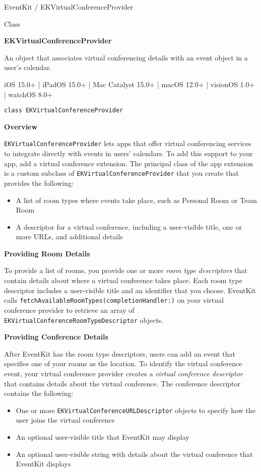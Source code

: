 \documentclass{article}
\title{}
\author{}
\date{}
\begin{document}
EventKit / EKVirtualConferenceProvider

Class

\textbf{EKVirtualConferenceProvider}

An object that associates virtual conferencing details with an event object in a user's calendar.

iOS 15.0+ | iPadOS 15.0+ | Mac Catalyst 15.0+ | macOS 12.0+ | visionOS 1.0+ | watchOS 8.0+

\texttt{class EKVirtualConferenceProvider}

\textbf{Overview}

\texttt{EKVirtualConferenceProvider} lets apps that offer virtual conferencing services to integrate directly with events in users' calendars. To add this support to your app, add a virtual conference extension. The principal class of the app extension is a custom subclass of \texttt{EKVirtualConferenceProvider} that you create that provides the following:

\begin{itemize}
\item A list of room types where events take place, such as Personal Room or Team Room
\item A descriptor for a virtual conference, including a user-visible title, one or more URLs, and additional details
\end{itemize}

\textbf{Providing Room Details}

To provide a list of rooms, you provide one or more \textit{room type descriptors} that contain details about where a virtual conference takes place. Each room type descriptor includes a user-visible title and an identifier that you choose. EventKit calls \texttt{fetchAvailableRoomTypes(completionHandler:)} on your virtual conference provider to retrieve an array of \texttt{EKVirtualConferenceRoomTypeDescriptor} objects.

\textbf{Providing Conference Details}

After EventKit has the room type descriptors, users can add an event that specifies one of your rooms as the location. To identify the virtual conference event, your virtual conference provider creates a \textit{virtual conference descriptor} that contains details about the virtual conference. The conference descriptor contains the following:

\begin{itemize}
\item One or more \texttt{EKVirtualConferenceURLDescriptor} objects to specify how the user joins the virtual conference
\item An optional user-visible title that EventKit may display
\item An optional user-visible string with details about the virtual conference that EventKit displays
\end{itemize}
\end{document}
